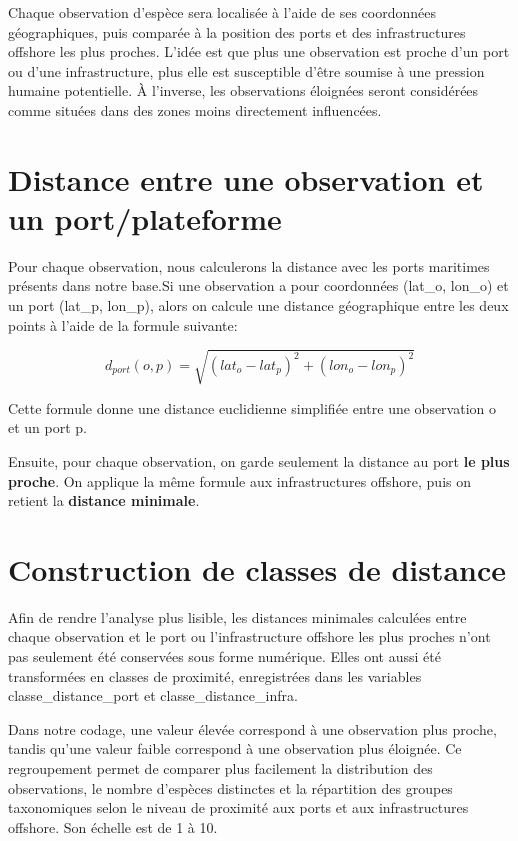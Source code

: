 \documentclass[mstat,12pt]{unswthesis}
\begin{document}
Chaque observation d'espèce sera localisée à l'aide de ses coordonnées
géographiques, puis comparée à la position des ports et des
infrastructures offshore les plus proches. L'idée est que plus une
observation est proche d'un port ou d'une infrastructure, plus elle est
susceptible d'être soumise à une pression humaine potentielle. À
l'inverse, les observations éloignées seront considérées comme situées
dans des zones moins directement influencées.

\bigskip

\section{Distance entre une observation et un
port/plateforme}\label{distance-entre-une-observation-et-un-portplateforme}

Pour chaque observation, nous calculerons la distance avec les ports
maritimes présents dans notre base.\newline Si une observation a pour
coordonnées (lat\_o, lon\_o) et un port (lat\_p, lon\_p), alors on
calcule une distance géographique entre les deux points à l'aide de la
formule suivante:

\[
d_{port}(o,p)=\sqrt{(lat_o - lat_p)^2 + (lon_o - lon_p)^2}
\]

Cette formule donne une distance euclidienne simplifiée entre une
observation o et un port p.

\bigskip

Ensuite, pour chaque observation, on garde seulement la distance au port
\textbf{le plus proche}. On applique la même formule aux infrastructures
offshore, puis on retient la \textbf{distance minimale}.

\section{Construction de classes de
distance}\label{construction-de-classes-de-distance}

Afin de rendre l'analyse plus lisible, les distances minimales calculées
entre chaque observation et le port ou l'infrastructure offshore les
plus proches n'ont pas seulement été conservées sous forme numérique.
Elles ont aussi été transformées en classes de proximité, enregistrées
dans les variables classe\_distance\_port et classe\_distance\_infra.

Dans notre codage, une valeur élevée correspond à une observation plus
proche, tandis qu'une valeur faible correspond à une observation plus
éloignée. Ce regroupement permet de comparer plus facilement la
distribution des observations, le nombre d'espèces distinctes et la
répartition des groupes taxonomiques selon le niveau de proximité aux
ports et aux infrastructures offshore. Son échelle est de 1 à 10.
\end{document}
